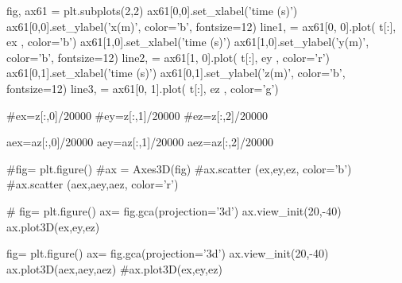 \documentclass{article}
\begin{document}
\begin{python}
fig, ax61 = plt.subplots(2,2)
ax61[0,0].set_xlabel('time (s)')
ax61[0,0].set_ylabel('x(m)', color='b', fontsize=12)
line1, = ax61[0, 0].plot( t[:], ex , color='b')
ax61[1,0].set_xlabel('time (s)')
ax61[1,0].set_ylabel('y(m)', color='b', fontsize=12)
line2, = ax61[1, 0].plot( t[:], ey , color='r')
ax61[0,1].set_xlabel('time (s)')
ax61[0,1].set_ylabel('z(m)', color='b', fontsize=12)
line3, = ax61[0, 1].plot( t[:], ez , color='g')



#ex=z[:,0]/20000
#ey=z[:,1]/20000
#ez=z[:,2]/20000

aex=az[:,0]/20000
aey=az[:,1]/20000
aez=az[:,2]/20000


#fig= plt.figure()
#ax = Axes3D(fig)
#ax.scatter (ex,ey,ez, color='b')
#ax.scatter (aex,aey,aez, color='r')


#
fig= plt.figure()
ax= fig.gca(projection='3d')
ax.view_init(20,-40)
ax.plot3D(ex,ey,ez)

fig= plt.figure()
ax= fig.gca(projection='3d')
ax.view_init(20,-40)
ax.plot3D(aex,aey,aez)
#ax.plot3D(ex,ey,ez)

\end{python}
\end{document}
